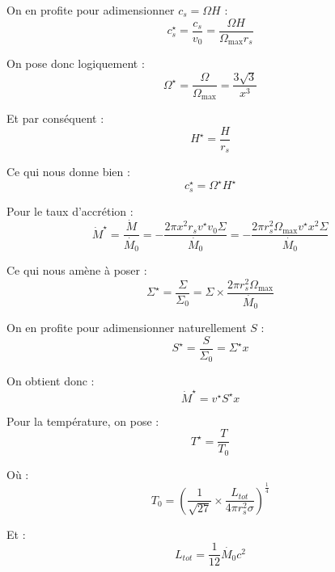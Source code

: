 On en profite pour adimensionner $c_s = \Omega H$ :
\begin{equation}
    c_s^\star = \frac{c_s}{v_0} = \frac{\Omega H}{\Omega_\mathrm{max} r_s}
\end{equation}

On pose donc logiquement :
\begin{equation}
    \Omega^\star = \frac{\Omega}{\Omega_\mathrm{max}} = \frac{3\sqrt{3}}{x^3}
\end{equation}

Et par conséquent :
\begin{equation}
    H^\star = \frac{H}{r_s}
\end{equation}

Ce qui nous donne bien :
\begin{equation}
    c_s^\star = \Omega^\star H^\star
\end{equation}

Pour le taux d’accrétion :
\begin{equation}
    \dot{M}^\star = \frac{\dot{M}}{\dot{M_0}} = - \frac{2 \pi x^2 r_s v^\star v_0 \Sigma}{\dot{M_0}} = - \frac{2 \pi r_s^2 \Omega_\mathrm{max} v^\star x^2 \Sigma}{\dot{M_0}} 
\end{equation}

Ce qui nous amène à poser :
\begin{equation}
    \Sigma^\star = \frac{\Sigma}{\Sigma_0} = \Sigma × \frac{2 \pi r_s^2 \Omega_\mathrm{max}}{\dot{M_0}}
\end{equation}

On en profite pour adimensionner naturellement $S$ :
\begin{equation}
    S^\star = \frac{S}{\Sigma_0} = \Sigma^\star x
\end{equation}

On obtient donc :
\begin{equation}
    \dot{M}^\star = v^\star S^\star x
\end{equation}

Pour la température, on pose :
\begin{equation}
    T^{\star} = \frac{T}{T_0}
\end{equation}

Où :
\begin{equation}
    T_0 = \left(\frac{1}{\sqrt{27}} × \frac{L_{tot}}{4 \pi r_s^2 \sigma} \right)^{\frac{1}{4}}
\end{equation}

Et :
\begin{equation}
    L_{tot} = \frac{1}{12} \dot{M_0} c^2
\end{equation}

